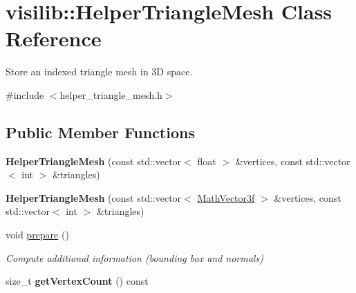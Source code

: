 \hypertarget{classvisilib_1_1_helper_triangle_mesh}{}\section{visilib\+::Helper\+Triangle\+Mesh Class Reference}
\label{classvisilib_1_1_helper_triangle_mesh}


Store an indexed triangle mesh in 3D space. 




{\ttfamily \#include $<$helper\+\_\+triangle\+\_\+mesh.\+h$>$}

\subsection*{Public Member Functions}
\begin{DoxyCompactItemize}
\item 
\mbox{\label{classvisilib_1_1_helper_triangle_mesh_af3d85f5b9db0f7da8a4c7e56f27d1994}} 
{\bfseries Helper\+Triangle\+Mesh} (const std\+::vector$<$ float $>$ \&vertices, const std\+::vector$<$ int $>$ \&triangles)
\item 
\mbox{\label{classvisilib_1_1_helper_triangle_mesh_afb5452ae562c39ee3b56dfd2d774b270}} 
{\bfseries Helper\+Triangle\+Mesh} (const std\+::vector$<$ \mbox{\hyperlink{classvisilib_1_1_math_vector3__}{Math\+Vector3f}} $>$ \&vertices, const std\+::vector$<$ int $>$ \&triangles)
\item 
\mbox{\label{classvisilib_1_1_helper_triangle_mesh_a075a6a388607a78ec69f21562b43e4c2}} 
void \mbox{\hyperlink{classvisilib_1_1_helper_triangle_mesh_a075a6a388607a78ec69f21562b43e4c2}{prepare}} ()
\begin{DoxyCompactList}\small\item\em Compute additional information (bounding box and normals) \end{DoxyCompactList}\item 
\mbox{\label{classvisilib_1_1_helper_triangle_mesh_a187c48eb8aec67ff7aac9f3d7aceaa8c}} 
size\+\_\+t {\bfseries get\+Vertex\+Count} () const
\item 
\mbox{\label{classvisilib_1_1_helper_triangle_mesh_a44733fc657f2b6e5f8bfd50e214c8424}} 

\end{DoxyCompactItemize}

